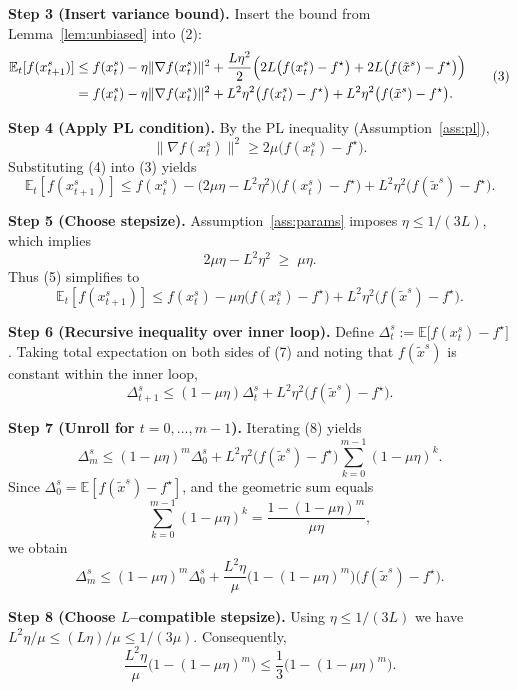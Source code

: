 \documentclass{article}
\begin{document}
\noindent\textbf{Step 3 (Insert variance bound).}  
Insert the bound from Lemma~\ref{lem:unbiased} into (2):
\[
\begin{aligned}
\mathbb{E}_{t}[f(x_{t+1}^{s})]
&\le f(x_{t}^{s})-\eta\|\nabla f(x_{t}^{s})\|^{2}
+\frac{L\eta^{2}}{2}\Bigl(2L\bigl(f(x_{t}^{s})-f^{\star}\bigr)
+2L\bigl(f(\tilde{x}^{s})-f^{\star}\bigr)\Bigr)\\
&= f(x_{t}^{s})-\eta\|\nabla f(x_{t}^{s})\|^{2}
+L^{2}\eta^{2}\bigl(f(x_{t}^{s})-f^{\star}\bigr)
+L^{2}\eta^{2}\bigl(f(\tilde{x}^{s})-f^{\star}\bigr).
\end{aligned}
\tag{3}
\]

\noindent\textbf{Step 4 (Apply PL condition).}  
By the PL inequality (Assumption~\ref{ass:pl}),
\[
\|\nabla f(x_{t}^{s})\|^{2}\ge 2\mu\bigl(f(x_{t}^{s})-f^{\star}\bigr).
\tag{4}
\]
Substituting (4) into (3) yields
\[
\mathbb{E}_{t}[f(x_{t+1}^{s})]
\le f(x_{t}^{s})-\bigl(2\mu\eta-L^{2}\eta^{2}\bigr)\bigl(f(x_{t}^{s})-f^{\star}\bigr)
+L^{2}\eta^{2}\bigl(f(\tilde{x}^{s})-f^{\star}\bigr).
\tag{5}
\]

\noindent\textbf{Step 5 (Choose stepsize).}  
Assumption~\ref{ass:params} imposes $\eta\le 1/(3L)$, which implies
\[
2\mu\eta-L^{2}\eta^{2}\;\ge\;\mu\eta.
\tag{6}
\]
Thus (5) simplifies to
\[
\mathbb{E}_{t}[f(x_{t+1}^{s})]
\le f(x_{t}^{s})-\mu\eta\bigl(f(x_{t}^{s})-f^{\star}\bigr)
+L^{2}\eta^{2}\bigl(f(\tilde{x}^{s})-f^{\star}\bigr).
\tag{7}
\]

\noindent\textbf{Step 6 (Recursive inequality over inner loop).}  
Define $\Delta_{t}^{s}:=\mathbb{E}\bigl[f(x_{t}^{s})-f^{\star}\bigr]$.  
Taking total expectation on both sides of (7) and noting that $f(\tilde{x}^{s})$ is constant within the inner loop,
\[
\Delta_{t+1}^{s}\le (1-\mu\eta)\Delta_{t}^{s}+L^{2}\eta^{2}\bigl(f(\tilde{x}^{s})-f^{\star}\bigr).
\tag{8}
\]

\noindent\textbf{Step 7 (Unroll for $t=0,\dots ,m-1$).}  
Iterating (8) yields
\[
\Delta_{m}^{s}\le (1-\mu\eta)^{m}\Delta_{0}^{s}
+L^{2}\eta^{2}\bigl(f(\tilde{x}^{s})-f^{\star}\bigr)\sum_{k=0}^{m-1}(1-\mu\eta)^{k}.
\tag{9}
\]
Since $\Delta_{0}^{s}= \mathbb{E}[f(\tilde{x}^{s})-f^{\star}]$, and the geometric sum equals
\[
\sum_{k=0}^{m-1}(1-\mu\eta)^{k}
=\frac{1-(1-\mu\eta)^{m}}{\mu\eta},
\tag{10}
\]
we obtain
\[
\Delta_{m}^{s}\le (1-\mu\eta)^{m}\Delta_{0}^{s}
+\frac{L^{2}\eta}{\mu}\bigl(1-(1-\mu\eta)^{m}\bigr)\bigl(f(\tilde{x}^{s})-f^{\star}\bigr).
\tag{11}
\]

\noindent\textbf{Step 8 (Choose $L$–compatible stepsize).}  
Using $\eta\le 1/(3L)$ we have $L^{2}\eta/\mu\le (L\eta)/\mu\le 1/(3\mu)$.  
Consequently,
\[
\frac{L^{2}\eta}{\mu}\bigl(1-(1-\mu\eta)^{m}\bigr)\le
\frac{1}{3}\bigl(1-(1-\mu\eta)^{m}\bigr).
\tag{12}
\]
\end{document}
